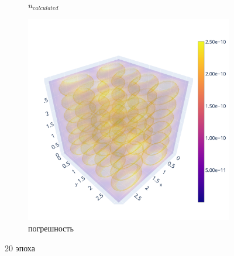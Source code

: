 \documentclass[a4paper,hidelinks,12pt]{article}
\begin{document}
\begin{figure}[H]
\begin{subfigure}{.33\textwidth}
  \caption{$u_{calculated}$}
\end{subfigure}%
\begin{subfigure}{.33\textwidth}
  \centering
  \includegraphics[width=\linewidth]{pictures/19_L1_256_diff.png}
  \caption{погрешность}
\end{subfigure}%
\caption{20 эпоха}
\label{fig:fig}
\end{figure}
\end{document}
